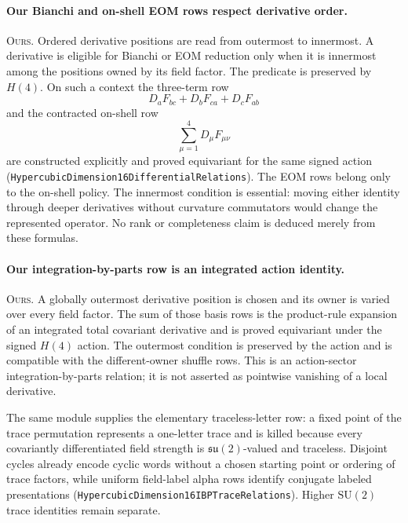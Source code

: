 \documentclass[11pt]{article}
\theoremstyle{definition}
\begin{document}
\paragraph{Our Bianchi and on-shell EOM rows respect derivative order.}
\textsc{Ours.} Ordered derivative positions are read from outermost to
innermost.  A derivative is eligible for Bianchi or EOM reduction only when it
is innermost among the positions owned by its field factor.  The predicate is
preserved by $H(4)$.  On such a context the three-term row
\[
 D_aF_{bc}+D_bF_{ca}+D_cF_{ab}
\]
and the contracted on-shell row
\[
 \sum_{\mu=1}^{4}D_\mu F_{\mu\nu}
\]
are constructed explicitly and proved equivariant for the same signed action
(\texttt{HypercubicDimension16DifferentialRelations}).  The EOM rows belong
only to the on-shell policy.  The innermost condition is essential: moving
either identity through deeper derivatives without curvature commutators
would change the represented operator.  No rank or completeness claim is
deduced merely from these formulas.

\paragraph{Our integration-by-parts row is an integrated action identity.}
\textsc{Ours.} A globally outermost derivative position is chosen and its
owner is varied over every field factor.  The sum of those basis rows is the
product-rule expansion of an integrated total covariant derivative and is
proved equivariant under the signed $H(4)$ action.  The outermost condition is
preserved by the action and is compatible with the different-owner shuffle
rows.  This is an action-sector integration-by-parts relation; it is not
asserted as pointwise vanishing of a local derivative.

The same module supplies the elementary traceless-letter row: a fixed point
of the trace permutation represents a one-letter trace and is killed because
every covariantly differentiated field strength is $\mathfrak{su}(2)$-valued
and traceless.  Disjoint cycles already encode cyclic words without a chosen
starting point or ordering of trace factors, while uniform field-label alpha
rows identify conjugate labeled presentations
(\texttt{HypercubicDimension16IBPTraceRelations}).  Higher
$\mathrm{SU}(2)$ trace identities remain separate.
\end{document}
